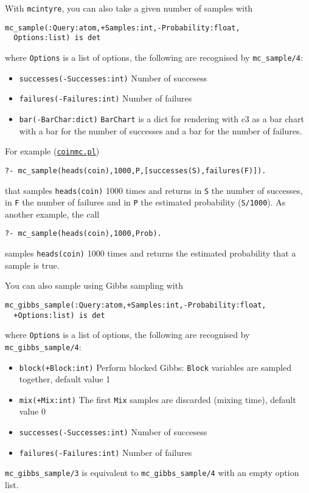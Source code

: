 With \verb|mcintyre|, you can also take a given number of samples with
\begin{verbatim}
mc_sample(:Query:atom,+Samples:int,-Probability:float,
  Options:list) is det
\end{verbatim}
where
\verb|Options| is a list of options, the following are recognised by \verb|mc_sample/4|:
\begin{itemize}
\item \verb|successes(-Successes:int)|
Number of succesess
\item \verb|failures(-Failures:int)|
Number of failures
\item \verb|bar(-BarChar:dict)|
\verb|BarChart| is a dict for rendering with c3 as a bar chart with
a bar for the number of successes and a bar for the number
of failures.
\end{itemize}
For example (\href{http://cplint.eu/e/coinmc.pl}{\texttt{coinmc.pl}})
\begin{verbatim}
?- mc_sample(heads(coin),1000,P,[successes(S),failures(F)]).
\end{verbatim}
that samples \verb|heads(coin)| 1000 times and returns in \verb|S| the number of successes, in \verb|F| the number of failures and in \verb|P| the
estimated probability (\verb|S/1000|).
As another example, the call
\begin{verbatim}
?- mc_sample(heads(coin),1000,Prob).
\end{verbatim}
samples \verb|heads(coin)| 1000 times and returns the
estimated probability that a sample is true.

You can also sample using Gibbs sampling with
\begin{verbatim}
mc_gibbs_sample(:Query:atom,+Samples:int,-Probability:float,
  +Options:list) is det
\end{verbatim}
where
\verb|Options| is a list of options, the following are recognised by \verb|mc_gibbs_sample/4|:
\begin{itemize}
\item \verb|block(+Block:int)|
   Perform blocked Gibbs: \verb|Block| variables are sampled together, default value 1
\item \verb|mix(+Mix:int)|
   The first \verb|Mix| samples are discarded (mixing time), default value 0
\item \verb|successes(-Successes:int)|
Number of succesess
\item \verb|failures(-Failures:int)|
Number of failures
\end{itemize}
\verb|mc_gibbs_sample/3| is equivalent to \verb|mc_gibbs_sample/4| with an empty option list.

